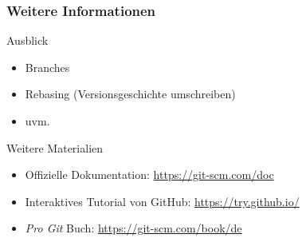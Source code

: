 \documentclass[accentcolor=tud8b,colorbacktitle,inverttitle,landscape,german,presentation,t]{tudbeamer}
\begin{document}
			\begin{frame}
				\frametitle{Weitere Informationen}
					\begin{block}{Ausblick}
						\begin{itemize}
							\item Branches
							\item Rebasing (Versionsgeschichte umschreiben)
							\item uvm.
						\end{itemize}
					\end{block}
					\begin{block}{Weitere Materialien}
						\begin{itemize}
							\item Offizielle Dokumentation: \href{https://git-scm.com/doc}{https://git-scm.com/doc}
							\item Interaktives Tutorial von GitHub: \href{https://try.github.io/}{https://try.github.io/}
							\item \textit{Pro Git} Buch: \href{https://git-scm.com/book/de}{https://git-scm.com/book/de}
						\end{itemize}
					\end{block}
			\end{frame}
	
\end{document}
